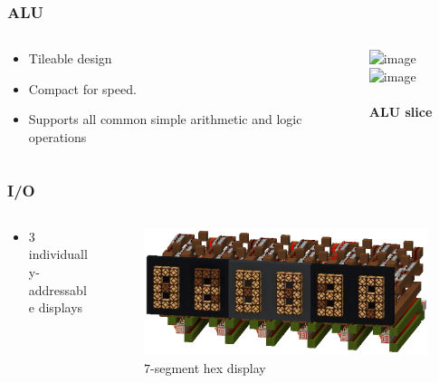 \documentclass[aspectratio=169]{beamer}
\begin{document}
\begin{frame}
	\frametitle{ALU}
	\begin{columns}
		\begin{column}{0.4\textwidth}
			\begin{itemize}
				\item Tileable design
				\item Compact for speed.
				\item Supports all common simple arithmetic and logic operations
			\end{itemize}
		\end{column}
		\begin{column}{0.6\textwidth}
			\begin{center}
				\includegraphics<1>[width=\textwidth]{imgs/alu_slice.png}
				\includegraphics<2->[width=0.8\textwidth]{imgs/alu.png}

				\framesubtitle<1>{ALU slice}
			\end{center}
		\end{column}
	\end{columns}
\end{frame}

\begin{frame}
	\frametitle{I/O}
	\begin{columns}
		\begin{column}{0.4\textwidth}
			\begin{itemize}
				\item $3$ individually-addressable displays
			\end{itemize}
		\end{column}
		\begin{column}{0.6\textwidth}
			\begin{figure}
				\includegraphics[width=\textwidth]{imgs/screen.png}
				\caption*{$7$-segment hex display}
			\end{figure}
		\end{column}
	\end{columns}
\end{frame}
\end{document}
